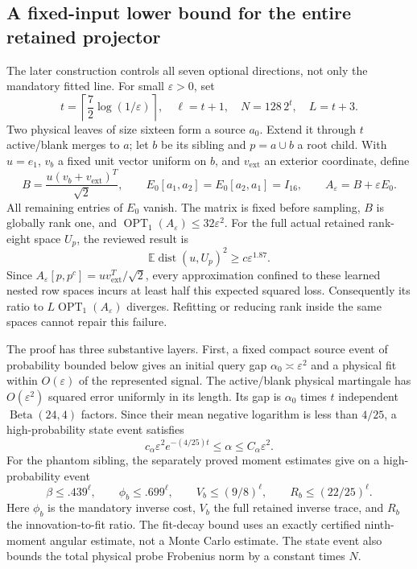 \documentclass[11pt,oneside,openany,a4paper]{report}
\numberwithin{equation}{chapter}
\theoremstyle{definition}
\theoremstyle{remark}
\begin{document}
\subsection{A fixed-input lower bound for the entire retained projector}

The later construction controls all seven optional directions, not
only the mandatory fitted line.  For small $\varepsilon>0$, set
\[
 t=\left\lceil\frac72\log(1/\varepsilon)\right\rceil,
 \quad\ell=t+1,\quad N=128\,2^t,\quad L=t+3.
\]
Two physical leaves of size sixteen form a source $a_0$.  Extend it
through $t$ active/blank merges to $a$; let $b$ be its sibling and
$p=a\cup b$ a root child.  With $u=e_1$, $v_b$ a fixed unit vector
uniform on $b$, and $v_{\mathrm{ext}}$ an exterior coordinate, define
\[
 B=\frac{u(v_b+v_{\mathrm{ext}})^T}{\sqrt2},\qquad
 E_0[a_1,a_2]=E_0[a_2,a_1]=I_{16},\qquad
 A_\varepsilon=B+\varepsilon E_0.
\]
All remaining entries of $E_0$ vanish.  The matrix is fixed before
sampling, $B$ is globally rank one, and
$\operatorname{OPT}_1(A_\varepsilon)\le32\varepsilon^2$.
For the full actual retained rank-eight space $U_p$, the reviewed result
is
\[
 \mathbb E\operatorname{dist}(u,U_p)^2
 \ge c\varepsilon^{1.87}.
 \tag{\thechapter.2}
\]
Since $A_\varepsilon[p,p^c]=uv_{\mathrm{ext}}^T/\sqrt2$, every
approximation confined to these learned nested row spaces incurs at
least half this expected squared loss.  Consequently its ratio to
$L\operatorname{OPT}_1(A_\varepsilon)$ diverges.  Refitting or reducing
rank inside the same spaces cannot repair this failure.

The proof has three substantive layers.  First, a fixed compact source
event of probability bounded below gives an initial query gap
$\alpha_0\asymp\varepsilon^2$ and a physical fit within
$O(\varepsilon)$ of the represented signal.  The active/blank physical
martingale has $O(\varepsilon^2)$ squared error uniformly in its length.
Its gap is $\alpha_0$ times $t$ independent
$\operatorname{Beta}(24,4)$ factors.  Since their mean negative
logarithm is less than $4/25$, a high-probability state event satisfies
\[
 c_\alpha\varepsilon^2e^{-(4/25)t}
 \le\alpha\le C_\alpha\varepsilon^2.
\]
For the phantom sibling, the separately proved moment estimates give
on a high-probability event
\[
 \beta\le .439^\ell,\qquad \phi_b\le .699^\ell,\qquad
 V_b\le(9/8)^\ell,\qquad R_b\le(22/25)^\ell.
\]
Here $\phi_b$ is the mandatory inverse cost, $V_b$ the full retained
inverse trace, and $R_b$ the innovation-to-fit ratio.  The fit-decay
bound uses an exactly certified ninth-moment angular estimate, not a
Monte Carlo estimate.  The state event also bounds the total physical
probe Frobenius norm by a constant times $N$.
\end{document}
